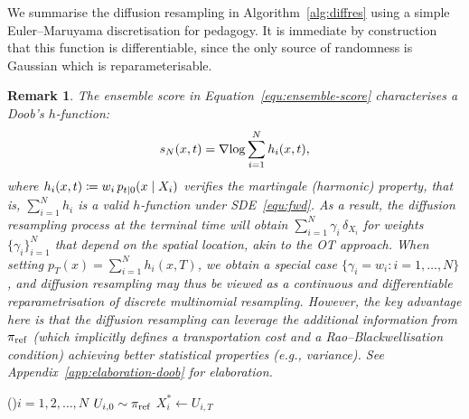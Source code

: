 \documentclass{article}
\newtheorem{remark}{Remark}
\begin{document}
We summarise the diffusion resampling in Algorithm~\ref{alg:diffres} using a simple Euler--Maruyama discretisation for pedagogy. 
It is immediate by construction that this function is differentiable, since the only source of randomness is Gaussian which is reparameterisable. 

\begin{remark}
    \label{remark:doob}
    The ensemble score in Equation~\eqref{equ:ensemble-score} characterises a Doob's $h$-function:
    \begin{equation}
        s_N(x, t) = \operatorname{\nabla\!} \log \sum_{i=1}^N h_i(x, t),
    \end{equation}
    where $h_i(x, t) \coloneqq w_i \, p_{t | 0}(x {\;|\;} X_i)$ verifies the martingale (harmonic) property, that is, $\sum_{i=1}^N h_i$ is a valid $h$-function under SDE~\eqref{equ:fwd}. 
    As a result, the diffusion resampling process at the terminal time will obtain $\sum_{i=1}^N \gamma_i \, \delta_{X_i}$ for weights $\lbrace \gamma_i \rbrace_{i=1}^N$ that depend on the spatial location, akin to the OT approach.
    When setting $p_T(x)=\sum_{i=1}^N h_i(x, T)$, we obtain a special case $\lbrace \gamma_i=w_i \colon i=1,\ldots, N \rbrace$,  
    and diffusion resampling may thus be viewed as a continuous and differentiable reparametrisation of discrete multinomial resampling. 
    However, the key advantage here is that the diffusion resampling can leverage the additional information from $\pi_{\mathrm{ref}}$ (which implicitly defines a transportation cost and a Rao--Blackwellisation condition) achieving better statistical properties (e.g., variance). 
    See Appendix~\ref{app:elaboration-doob} for elaboration.
\end{remark}

\begin{algorithm2e}[t!]
    \SetAlgoLined
    \DontPrintSemicolon
    \For(){$i=1,2,\ldots, N$}{%
        $U_{i, 0} \sim \pi_{\mathrm{ref}}$\;
        $X^*_i \gets U_{i, T}$
    }
    \caption{Diffusion resampling \texttt{diffres}}
    \label{alg:diffres}
\end{algorithm2e}
\end{document}
